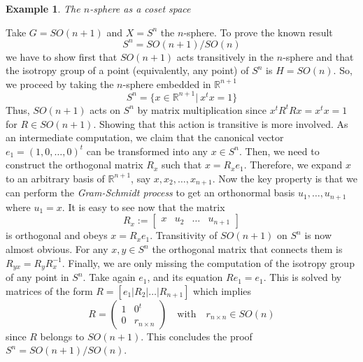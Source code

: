 \documentclass[a4paper,12pt]{article}
\newtheorem{exm}{Example}
\numberwithin{equation}{section}
\numberwithin{thm}{section}
\numberwithin{exm}{section}
\newcommand{\mo}{^{-1}}
\newcommand{\R}{{\mathbb R}}
\newcommand{\<}{{\langle}}
\renewcommand{\>}{{\rangle}}
\begin{document}
\begin{exm} The $n$-sphere as a coset space \end{exm}
Take $G=SO(n+1)$ and $X=S^n$ the $n$-sphere. To prove the known result
	\begin{equation}
	S^n = SO(n+1)/SO(n)
	\end{equation}
we have to show first that $SO(n+1)$ acts transitively in the $n$-sphere and that the isotropy group of a point (equivalently, any point) of $S^n$ is $H= SO(n)$. So, we proceed by taking the $n$-sphere embedded in $\R^{n+1}$
	\begin{equation}
	S^n = \{x\in\R^{n+1}|\ x^t x = 1\}
	\end{equation}
Thus, $SO(n+1)$ acts on $S^n$ by matrix multiplication since $x^t R^t R x = x^t x = 1$ for $R\in SO(n+1)$. Showing that this action is transitive is more involved. As an intermediate computation, we claim that the canonical vector $e_1 = (1,0,\ldots,0)^t$ can be transformed into any $x\in S^n$. Then, we need to construct the orthogonal matrix $R_x$ such that $x = R_x e_1$. Therefore, we expand $x$ to an arbitrary basis of $\R^{n+1}$, say $x,x_2,\ldots,x_{n+1}$. Now the key property is that we can perform the {\it Gram-Schmidt process} to get an orthonormal basis $u_1,\ldots, u_{n+1}$ where $u_1 = x$. It is easy to see now that the matrix
	\begin{equation}
	R_x := \left[
		\begin{array}{cccc}
		x & u_2 & \ldots & u_{n+1}
		\end{array}
	\right]
	\end{equation}
is orthogonal and obeys $x = R_x e_1$. Transitivity of $SO(n+1)$ on $S^n$ is now almost obvious. For any $x,y\in S^n$ the orthogonal matrix that connects them is $R_{yx} = R_y R_x\mo$. Finally, we are only missing the computation of the isotropy group of any point in $S^n$. Take again $e_1$, and its equation $R e_1 = e_1$. This is solved by matrices of the form $R = [e_1|R_2|\ldots|R_{n+1}]$ which implies
	\begin{equation}
	R = \left(
		\begin{array}{cc}
		1 & 0^t \\
		0 & r_{n\times n}
		\end{array}
	\right)\quad \text{with}\quad r_{n\times n}\in SO(n)
	\end{equation}
since $R$ belongs to $SO(n+1)$. This concludes the proof $S^n = SO(n+1)/SO(n)$.
\end{document}
